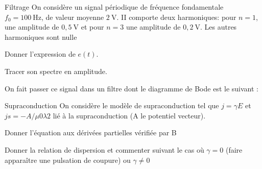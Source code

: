 
\begin{exo}[PC][1][oral]{Filtrage}
  On considère un signal périodique de fréquence fondamentale $f_0=100 \mathrm{~Hz}$, de valeur moyenne $2 \mathrm{~V}$. II comporte deux harmoniques: pour $n=1$, une amplitude de $0,5 \mathrm{~V}$ et pour $n=3$ une amplitude de $0,2 \mathrm{~V}$. Les autres harmoniques sont nulle
  \begin{quest}
\item Donner l'expression de $e(t)$.
\item Tracer son spectre en amplitude.
\item On fait passer ce signal dans un filtre dont le diagramme de Bode est le suivant :
\end{quest}
\end{exo}

\begin{exo}[PC][1][oral]{Supraconduction}
  On considère le modèle de supraconduction tel que $j=\gamma E$ et $j s=-A / \mu 0 \lambda 2$ lié à la supraconduction (A le potentiel vecteur).
  \begin{quest}
    \item Donner l'équation aux dérivées partielles vérifiée par B
    \item Donner la relation de dispersion et commenter suivant le cas où $\gamma=0$ (faire apparaître une pulsation de coupure) ou $\gamma \neq 0$
\end{quest}
\end{exo}

